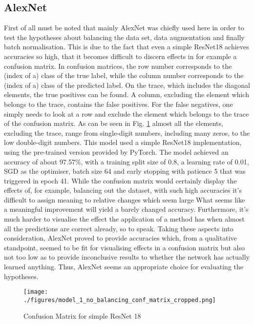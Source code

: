 \subsection{AlexNet}\label{resultsAlexNet}
First of all must be noted that mainly AlexNet was chiefly used here in order to test the hypotheses about balancing the data set, data augmentation and finally batch normalisation. This is due to the fact that even a simple ResNet18 achieves accuracies so high, that it becomes difficult to discern effects in for example a confusion matrix. In confusion matrices, the row number corresponds to the (index of a) class of the true label, while the column number corresponds to the (index of a) class of the predicted label. On the trace, which includes the diagonal elements, the true positives can be found. A column, excluding the element which belongs to the trace, contains the false positives. For the false negatives, one simply needs to look at a row and exclude the element which belongs to the trace of the confusion matrix. As can be seen in Fig. \ref{fig:res18-confmatrix} almost all the elements, excluding the trace, range from single-digit numbers, including many zeros, to the low double-digit numbers. This model used a simple ResNet18 implementation, using the pre-trained version provided by PyTorch. The model achieved an accuracy of about 97.57\%, with a training split size of 0.8, a learning rate of 0.01, SGD as the optimiser, batch size 64 and early stopping with patience 5 that was triggered in epoch 41. While the confusion matrix would certainly display the effects of, for example, balancing out the dataset, with such high accuracies it's difficult to assign meaning to relative changes which seem large What seems like a meaningful improvement will yield a barely changed accuracy. Furthermore, it's much harder to visualise the effect the application of a method has when almost all the predictions are correct already, so to speak. Taking these aspects into consideration, AlexNet proved to provide accuracies which, from a qualitative standpoint, seemed to be fit for visualising effects in a confusion matrix but also not too low as to provide inconclusive results to whether the network has actually learned anything. Thus, AlexNet seems an appropriate choice for evaluating the hypotheses.
\begin{figure}[h]
	\centering
	\texttt{[image: ./figures/model\_1\_no\_balancing\_conf\_matrix\_cropped.png]}
	\caption{Confusion Matrix for simple ResNet 18}
	\label{fig:res18-confmatrix}
\end{figure}



